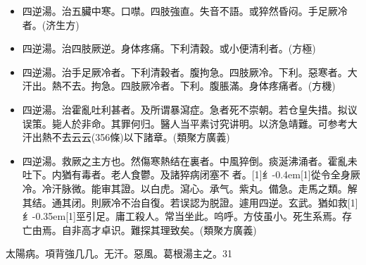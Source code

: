 \documentclass[oneside,b4paper]{ctexbook}
\begin{document}
\begin{flushleft}
\begin{itemize}
\item 四逆湯。治五臟中寒。口噤。四肢強直。失音不語。或猝然昏闷。手足厥冷者。(济生方)
\item 四逆湯。治四肢厥逆。身体疼痛。下利清穀。或小便清利者。(方極)
\item 四逆湯。治手足厥冷者。下利清穀者。腹拘急。四肢厥冷。下利。惡寒者。大汗出。熱不去。拘急。四肢厥冷者。下利。腹脹滿。身体疼痛者。(方機)
\item 四逆湯。治霍亂吐利甚者。及所谓暴瀉症。急者死不崇朝。若仓皇失措。拟议误策。毙人於非命。其罪何归。醫人当平素讨究讲明。以济急靖難。可参考大汗出熱不去云云(356條)以下諸章。(類聚方廣義)
\item 四逆湯。救厥之主方也。然傷寒熱结在裏者。中風猝倒。痰涎沸涌者。霍亂未吐下。内猶有毒者。老人食鬱。及諸猝病闭塞不{𫔭}者。{\hbox{\scalebox{0.6}[1]{纟}\kern-0.4em\scalebox{0.7}[1]{從}}}令全身厥冷。冷汗脉微。能审其證。以白虎。瀉心。承气。紫丸。備急。走馬之類。解其结。通其闭。則厥冷不治自復。若误認为脱證。遽用四逆。玄武。猶如救{\hbox{\scalebox{0.68}[1]{纟}\kern-0.35em\scalebox{0.64}[1]{巠}}}引足。庸工殺人。常当坐此。呜呼。方伎虽小。死生系焉。存亡由焉。自非高才卓识。難探其理致矣。(類聚方廣義)
\end{itemize}

太陽病。項背強几几。无汗。惡風。葛根湯主之。31


\end{flushleft}
\end{document}
